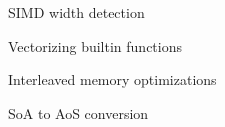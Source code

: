 
\begin{frame}{SIMD width detection}

\end{frame}


\begin{frame}{Vectorizing builtin functions}

\end{frame}


\begin{frame}{Interleaved memory optimizations}

\end{frame}


\begin{frame}{SoA to AoS conversion}

\end{frame}


